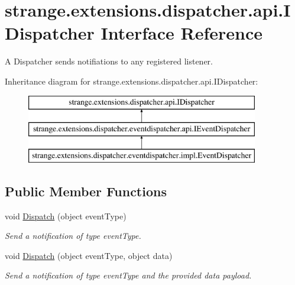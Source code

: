 \hypertarget{interfacestrange_1_1extensions_1_1dispatcher_1_1api_1_1_i_dispatcher}{\section{strange.\-extensions.\-dispatcher.\-api.\-I\-Dispatcher Interface Reference}
\label{interfacestrange_1_1extensions_1_1dispatcher_1_1api_1_1_i_dispatcher}
}


A Dispatcher sends notifiations to any registered listener.  


Inheritance diagram for strange.\-extensions.\-dispatcher.\-api.\-I\-Dispatcher\-:\begin{figure}[H]
\begin{center}
\leavevmode
\includegraphics[height=3.000000cm]{interfacestrange_1_1extensions_1_1dispatcher_1_1api_1_1_i_dispatcher}
\end{center}
\end{figure}
\subsection*{Public Member Functions}
\begin{DoxyCompactItemize}
\item 
void \hyperlink{interfacestrange_1_1extensions_1_1dispatcher_1_1api_1_1_i_dispatcher_afec6755050bf9891321a7bfd4da1f06b}{Dispatch} (object event\-Type)
\begin{DoxyCompactList}\small\item\em Send a notification of type event\-Type. \end{DoxyCompactList}\item 
void \hyperlink{interfacestrange_1_1extensions_1_1dispatcher_1_1api_1_1_i_dispatcher_a71f605859b2507f1248190fe37d96eed}{Dispatch} (object event\-Type, object data)
\begin{DoxyCompactList}\small\item\em Send a notification of type event\-Type and the provided data payload. \end{DoxyCompactList}\end{DoxyCompactItemize}


